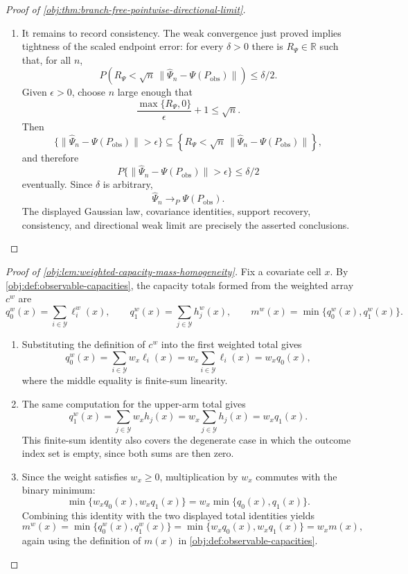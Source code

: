 \documentclass[11pt]{article}
\begin{document}
\begin{proof}[Proof of \cref{obj:thm:branch-free-pointwise-directional-limit}]
\begin{enumerate}
\item It remains to record consistency. The weak convergence just proved implies tightness of the scaled endpoint error: for every \(\delta>0\) there is \(R_\Psi\in\mathbb R\) such that, for all \(n\),
\[
P\!\left(
R_\Psi<
\sqrt n\,\|\widehat\Psi_n-\Psi(P_{\mathrm{obs}})\|
\right)
\le \delta/2 .
\]
Given \(\epsilon>0\), choose \(n\) large enough that
\[
\frac{\max\{R_\Psi,0\}}{\epsilon}+1\le\sqrt n .
\]
Then
\[
\{\|\widehat\Psi_n-\Psi(P_{\mathrm{obs}})\|>\epsilon\}
\subseteq
\left\{
R_\Psi<
\sqrt n\,\|\widehat\Psi_n-\Psi(P_{\mathrm{obs}})\|
\right\},
\]
and therefore
\[
P\{\|\widehat\Psi_n-\Psi(P_{\mathrm{obs}})\|>\epsilon\}\le\delta/2
\]
eventually. Since \(\delta\) is arbitrary,
\[
\widehat\Psi_n\to_P\Psi(P_{\mathrm{obs}}).
\]
The displayed Gaussian law, covariance identities, support recovery, consistency, and directional weak limit are precisely the asserted conclusions. %
\end{enumerate}
\end{proof}

\begin{proof}[Proof of \cref{obj:lem:weighted-capacity-mass-homogeneity}]
Fix a covariate cell \(x\).  By \cref{obj:def:observable-capacities}, the capacity totals formed from the weighted array \(c^w\) are
\[
q_0^w(x)=\sum_{i\in\mathcal Y}\ell_i^w(x),
\qquad
q_1^w(x)=\sum_{j\in\mathcal Y}h_j^w(x),
\qquad
m^w(x)=\min\{q_0^w(x),q_1^w(x)\}.
\]

\begin{enumerate}
\item Substituting the definition of \(c^w\) into the first weighted total gives
\[
q_0^w(x)
=\sum_{i\in\mathcal Y} w_x\ell_i(x)
=w_x\sum_{i\in\mathcal Y}\ell_i(x)
=w_x q_0(x),
\]
where the middle equality is finite-sum linearity. %

\item The same computation for the upper-arm total gives
\[
q_1^w(x)
=\sum_{j\in\mathcal Y} w_xh_j(x)
=w_x\sum_{j\in\mathcal Y}h_j(x)
=w_x q_1(x).
\]
This finite-sum identity also covers the degenerate case in which the outcome index set is empty, since both sums are then zero. %

\item Since the weight satisfies \(w_x\ge 0\), multiplication by \(w_x\) commutes with the binary minimum:
\[
\min\{w_xq_0(x),w_xq_1(x)\}
=
w_x\min\{q_0(x),q_1(x)\}.
\]
Combining this identity with the two displayed total identities yields
\[
m^w(x)
=\min\{q_0^w(x),q_1^w(x)\}
=\min\{w_xq_0(x),w_xq_1(x)\}
=w_xm(x),
\]
again using the definition of \(m(x)\) in \cref{obj:def:observable-capacities}. %
\end{enumerate}
\end{proof}
\end{document}
